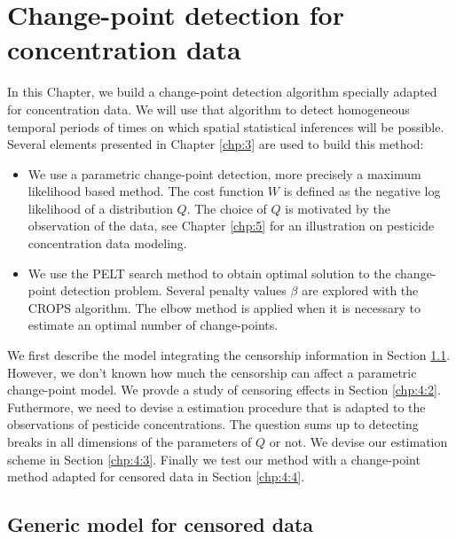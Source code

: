 \chapter{Change-point detection for concentration data}\label{chp:4}

\minitoc

\clearpage

In this Chapter, we build a change-point detection algorithm specially adapted for concentration data. We will use that algorithm to detect homogeneous temporal periods of times on which spatial statistical inferences will be possible. Several elements presented in Chapter \ref{chp:3} are used to build this method:  
\begin{itemize}
\item We use a parametric change-point detection, more precisely a maximum likelihood based method. The cost function $W$ is defined as the negative log likelihood of a distribution $Q$. The choice of $Q$ is motivated by the observation of the data, see Chapter \ref{chp:5} for an illustration on pesticide concentration data modeling.  
\item We use the PELT search method to obtain optimal solution to the change-point detection problem. Several penalty values $\beta$ are explored with the CROPS algorithm. The elbow method is applied when it is necessary to estimate an optimal number of change-points.   
\end{itemize}
We first describe the model integrating the censorship information in Section \ref{chp:4:1}. However, we don't known how much the censorship can affect a parametric change-point model. We provde a study of censoring effects in Section \ref{chp:4:2}. Futhermore, we need to devise a estimation procedure that is adapted to the observations of pesticide concentrations. The question sums up to detecting breaks in all dimensions of the parameters of $Q$ or not. We devise our estimation scheme in Section \ref{chp:4:3}. Finally we test our method with a change-point method adapted for censored data in Section \ref{chp:4:4}.  


\section{Generic model for censored data}\label{chp:4:1}

